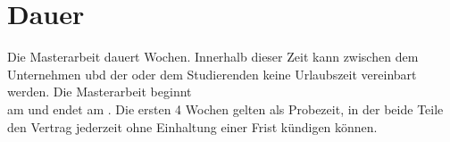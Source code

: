\section{Dauer}

Die Masterarbeit dauert \thesisTime Wochen. Innerhalb dieser Zeit kann zwischen dem Unternehmen ubd der oder dem Studierenden keine Urlaubszeit vereinbart werden.
Die Masterarbeit beginnt \\ am \spaceLine und endet am \spaceLine.
Die ersten 4 Wochen gelten als Probezeit, in der beide Teile den Vertrag jederzeit ohne Einhaltung einer Frist kündigen können.